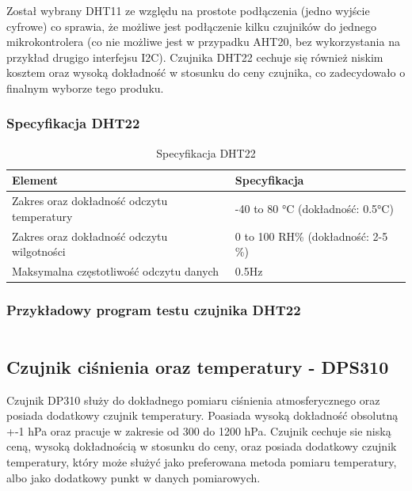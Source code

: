\documentclass[12pt,a4paper]{article}
\begin{document}
Został wybrany DHT11 ze względu na prostote podłączenia (jedno wyjście cyfrowe) co sprawia, że możliwe jest podłączenie
kilku czujników do jednego mikrokontrolera (co nie możliwe jest w przypadku AHT20, bez wykorzystania na przykład drugigo interfejsu I2C).
Czujnika DHT22 cechuje się również niskim kosztem oraz wysoką dokładność w stosunku do ceny czujnika, co zadecydowało o finalnym wyborze tego produku. 

\subsubsection{Specyfikacja DHT22}

\begin{table}[H]
    \centering
    \begin{tabular}{|l|l|}
        \hline
        Element & Specyfikacja \\
        \hline
        Zakres oraz dokładność odczytu temperatury & -40 to 80 °C (dokładność: 0.5°C) \\
        \hline
        Zakres oraz dokładność odczytu wilgotności & 0 to 100 RH\% (dokładność: 2-5 \%) \\
        \hline
        Maksymalna częstotliwość odczytu danych & 0.5Hz \\
        \hline
    \end{tabular}
    \caption{Specyfikacja DHT22}
    \label{dht22-spec}
\end{table}

\subsubsection{Przykładowy program testu czujnika DHT22}

\begin{code}[H]
\inputminted[frame=lines,]{c}{../proj/dht22-test/dht22-test.ino}

\caption{Test czujnika DHT22}
\end{code}

\subsection{Czujnik ciśnienia oraz temperatury - DPS310}

Czujnik DP310 służy do dokładnego pomiaru ciśnienia atmosferycznego oraz posiada dodatkowy czujnik temperatury. Poasiada wysoką dokładność obsolutną +-1 hPa oraz 
pracuje w zakresie od 300 do 1200 hPa. Czujnik cechuje sie niską ceną, wysoką dokładnością w stosunku do ceny, oraz posiada dodatkowy czujnik temperatury, który może 
służyć jako preferowana metoda pomiaru temperatury, albo jako dodatkowy punkt w danych pomiarowych.
\end{document}
